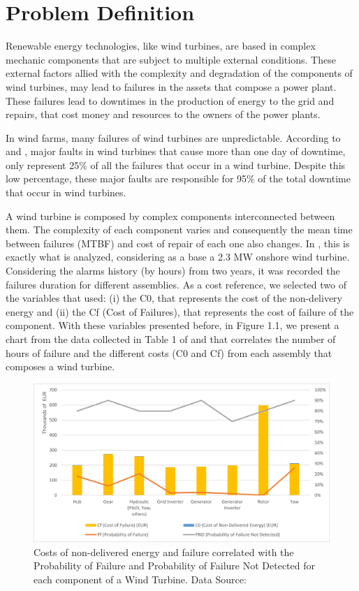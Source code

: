 \section{Problem Definition} 
\label{sub:if_you_use_this_template} 

Renewable energy technologies, like wind turbines, are based in complex mechanic components that are subject to multiple external conditions. These external factors allied with the complexity and degradation of the components of wind turbines, may lead to failures in the assets that compose a power plant. These failures lead to downtimes in the production of energy to the grid and repairs, that cost money and resources to the owners of the power plants.

In wind farms, many failures of wind turbines are unpredictable. According to \cite{OLD_44_WIND} and \cite{OLD_18_WIND}, major faults in wind turbines that cause more than one day of downtime, only represent 25\% of all the failures that occur in a wind turbine. Despite this low percentage, these major faults are responsible for 95\% of the total downtime that occur in wind turbines.

A wind turbine is composed by complex components interconnected between them. The complexity of each component varies and consequently the mean time between failures (MTBF) and cost of repair of each one also changes. In \cite{OLD_55_WIND}, this is exactly what is analyzed, considering as a base a 2.3 MW onshore wind turbine. Considering the alarms history (by hours) from two years, it was recorded the failures duration for different assemblies. As a cost reference, we selected two of the variables that \cite{OLD_55_WIND} used: (i) the C0, that represents the cost of the non-delivery energy and (ii) the Cf (Cost of Failures), that represents the cost of failure of the component. With these variables presented before, in Figure 1.1, we present a chart from the data collected in Table 1 of \cite{OLD_55_WIND} and that correlates the number of hours of failure and the different costs (C0 and Cf) from each assembly that composes a wind turbine.

\begin{figure}[htbp]
	\centering
	\includegraphics[scale=0.8]{Chapters/Figures/introduction_fig1.png}
	\caption{Costs of non-delivered energy and failure correlated with the Probability of Failure and Probability of Failure Not Detected for each component of a Wind Turbine. Data Source: \cite{OLD_55_WIND}}
	\label{fig:Figuras_Tree_silhouettes-vectorial}
\end{figure}

